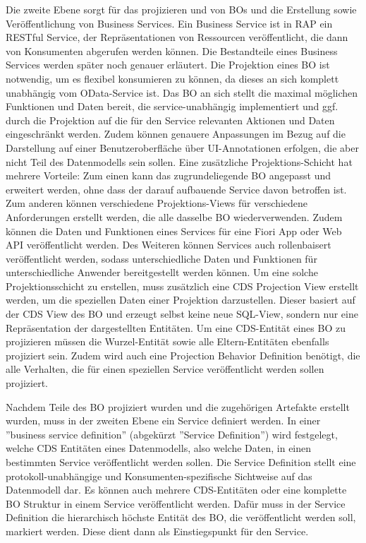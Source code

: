 Die zweite Ebene sorgt für das projizieren und von BOs und die Erstellung sowie Veröffentlichung von Business Services. Ein Business Service ist in RAP ein RESTful Service, der Repräsentationen von Ressourcen veröffentlicht, die dann von Konsumenten abgerufen werden können. Die Bestandteile eines Business Services werden später noch genauer erläutert. Die Projektion eines BO ist notwendig, um es flexibel konsumieren zu können, da dieses an sich komplett unabhängig vom OData-Service ist. Das BO an sich stellt die maximal möglichen Funktionen und Daten bereit, die service-unabhängig implementiert und ggf. durch die Projektion auf die für den Service relevanten Aktionen und Daten eingeschränkt werden. Zudem können genauere Anpassungen \zB im Bezug auf die Darstellung auf einer Benutzeroberfläche über UI-Annotationen erfolgen, die aber nicht Teil des Datenmodells sein sollen. Eine zusätzliche Projektions-Schicht hat mehrere Vorteile: Zum einen kann das zugrundeliegende BO angepasst und erweitert werden, ohne dass der darauf aufbauende Service davon betroffen ist. Zum anderen können verschiedene Projektions-Views für verschiedene Anforderungen erstellt werden, die alle dasselbe BO wiederverwenden. Zudem können die Daten und Funktionen eines Services für eine Fiori App oder Web API veröffentlicht werden. Des Weiteren können Services auch rollenbaisert veröffentlicht werden, sodass unterschiedliche Daten und Funktionen für unterschiedliche Anwender bereitgestellt werden können. Um eine solche Projektionsschicht zu erstellen, muss zusätzlich eine CDS Projection View erstellt werden, um die speziellen Daten einer Projektion darzustellen. Dieser basiert auf der CDS View des BO und erzeugt selbst keine neue SQL-View, sondern nur eine Repräsentation der dargestellten Entitäten. Um eine CDS-Entität eines BO zu projizieren müssen die Wurzel-Entität sowie alle Eltern-Entitäten ebenfalls projiziert sein. Zudem wird auch eine Projection Behavior Definition benötigt, die alle Verhalten, die für einen speziellen Service veröffentlicht werden sollen projiziert.

Nachdem Teile des BO projiziert wurden und die zugehörigen Artefakte erstellt wurden, muss in der zweiten Ebene ein Service definiert werden. In einer ''business service definition'' (abgekürzt ''Service Definition'') wird festgelegt, welche CDS Entitäten eines Datenmodells, also welche Daten, in einen bestimmten Service veröffentlicht werden sollen. Die Service Definition stellt eine protokoll-unabhängige und Konsumenten-spezifische Sichtweise auf das Datenmodell dar. Es können auch mehrere CDS-Entitäten oder eine komplette BO Struktur in einem Service veröffentlicht werden. Dafür muss in der Service Definition die hierarchisch höchste Entität des BO, die veröffentlicht werden soll, markiert werden. Diese dient dann als Einstiegspunkt für den Service.


